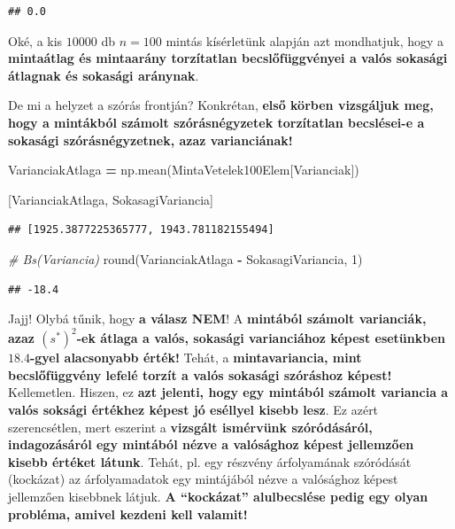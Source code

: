 \documentclass[
]{book}
\newenvironment{Shaded}{\begin{snugshade}}{\end{snugshade}}
\newcommand{\BuiltInTok}[1]{#1}
\newcommand{\CommentTok}[1]{\textcolor[rgb]{0.56,0.35,0.01}{\textit{#1}}}
\newcommand{\DecValTok}[1]{\textcolor[rgb]{0.00,0.00,0.81}{#1}}
\newcommand{\NormalTok}[1]{#1}
\newcommand{\OperatorTok}[1]{\textcolor[rgb]{0.81,0.36,0.00}{\textbf{#1}}}
\newcommand{\StringTok}[1]{\textcolor[rgb]{0.31,0.60,0.02}{#1}}
\begin{document}
\begin{verbatim}
## 0.0
\end{verbatim}

Oké, a kis \(10000\) db \(n=100\) mintás kísérletünk alapján azt mondhatjuk, hogy a \textbf{mintaátlag és mintaarány torzítatlan becslőfüggvényei a valós sokasági átlagnak és sokasági aránynak}.

De mi a helyzet a szórás frontján? Konkrétan, \textbf{első körben vizsgáljuk meg, hogy a mintákból számolt szórásnégyzetek torzítatlan becslései-e a sokasági szórásnégyzetnek, azaz varianciának!}

\begin{Shaded}
\begin{Highlighting}[]
\NormalTok{VarianciakAtlaga }\OperatorTok{=}\NormalTok{ np.mean(MintaVetelek100Elem[}\StringTok{\textquotesingle{}Varianciak\textquotesingle{}}\NormalTok{])}

\NormalTok{[VarianciakAtlaga, SokasagiVariancia]}
\end{Highlighting}
\end{Shaded}

\begin{verbatim}
## [1925.3877225365777, 1943.781182155494]
\end{verbatim}

\begin{Shaded}
\begin{Highlighting}[]
\CommentTok{\# Bs(Variancia)}
\BuiltInTok{round}\NormalTok{(VarianciakAtlaga }\OperatorTok{{-}}\NormalTok{ SokasagiVariancia, }\DecValTok{1}\NormalTok{)}
\end{Highlighting}
\end{Shaded}

\begin{verbatim}
## -18.4
\end{verbatim}

Jajj! Olybá tűnik, hogy \textbf{a válasz NEM}! A \textbf{mintából számolt varianciák, azaz \({(s^*)}^2\)-ek átlaga a valós, sokasági varianciához képest esetünkben \(18.4\)-gyel alacsonyabb érték!} Tehát, a \textbf{mintavariancia, mint becslőfüggvény lefelé torzít a valós sokasági szóráshoz képest!} Kellemetlen. Hiszen, ez \textbf{azt jelenti, hogy egy mintából számolt variancia a valós soksági értékhez képest jó eséllyel kisebb lesz}. Ez azért szerencsétlen, mert eszerint a \textbf{vizsgált ismérvünk szóródásáról, indagozásáról egy mintából nézve a valósághoz képest jellemzően kisebb értéket látunk}.
Tehát, pl. egy részvény árfolyamának szóródását (kockázat) az árfolyamadatok egy mintájából nézve a valósághoz képest jellemzően kisebbnek látjuk. \textbf{A ``kockázat'' alulbecslése pedig egy olyan probléma, amivel kezdeni kell valamit!}
\end{document}
